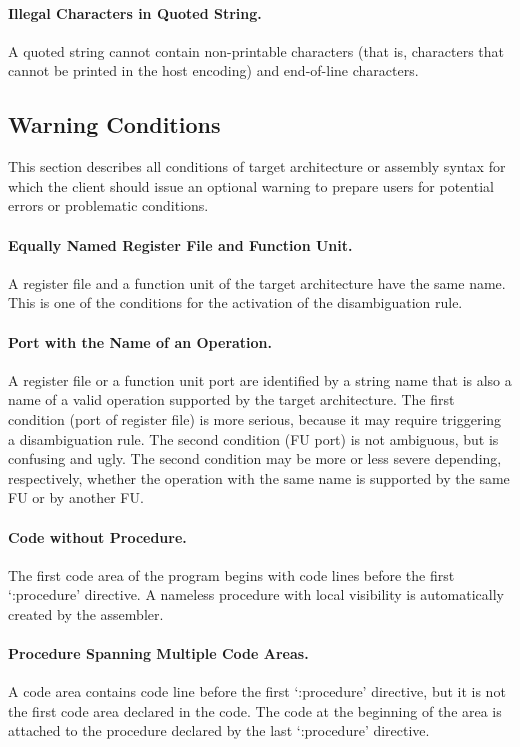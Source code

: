 \documentclass[a4paper,twoside]{tceusermanual}
\begin{document}
\paragraph{Illegal Characters in Quoted String.}
A quoted string cannot contain non-printable characters (that is, characters
that cannot be printed in the host encoding) and end-of-line characters.

\subsection{Warning Conditions}
\label{ssec:warnings}

This section describes all conditions of target architecture or assembly
syntax for which the client should issue an optional warning to prepare
users for potential errors or problematic conditions.

\paragraph{Equally Named Register File and Function Unit.}
A register file and a function unit of the target architecture have the same
name.  This is one of the conditions for the activation of the
disambiguation rule.

\paragraph{Port with the Name of an Operation.}
A register file or a function unit port are identified by a string name that
is also a name of a valid operation supported by the target architecture.
The first condition (port of register file) is more serious, because it may
require triggering a disambiguation rule.  The second condition (FU port) is
not ambiguous, but is confusing and ugly.  The second condition may be more
or less severe depending, respectively, whether the operation with the same
name is supported by the same FU or by another FU.

\paragraph{Code without Procedure.}
The first code area of the program begins with code lines before the first
`:procedure' directive. A nameless procedure with local visibility is
automatically created by the assembler.

\paragraph{Procedure Spanning Multiple Code Areas.}
A code area contains code line before the first `:procedure' directive, but
it is not the first code area declared in the code. The code at the
beginning of the area is attached to the procedure declared by the last
`:procedure' directive.
\end{document}
